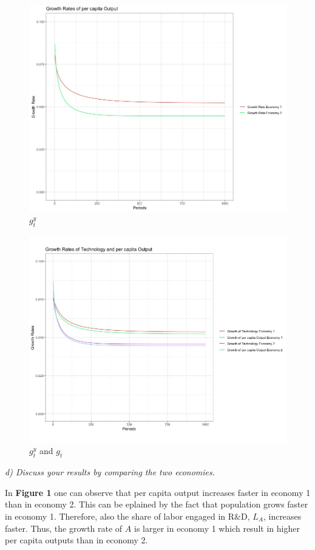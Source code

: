 \documentclass[11pt]{article} %
\begin{document}
\pagebreak
 \begin{figure}[h!]
\caption{$g_t^y$}
\centering
\label{figure2}
\includegraphics[width=12cm]{plots/percapita.jpeg}
\end{figure}

 \begin{figure}[h!]
\caption{$g_t^y$ and $g_t$}
\centering
\label{figure3}
\includegraphics[width=12cm]{plots/comp.jpeg}
\end{figure}



\pagebreak
\textit{d) Discuss your results by comparing the two economies.} \par

In \textbf{Figure 1} one can observe that per capita output increases faster in economy 1 than in economy 2. This can be eplained by the fact that population grows faster in economy 1. Therefore, also the share of labor engaged in R\&D, $L_A$, increases faster. Thus, the growth rate of $A$ is larger in economy 1 which result in higher per capita outputs than in economy 2.\par
\end{document}
